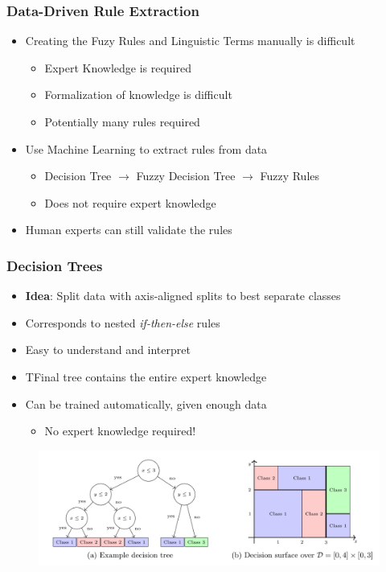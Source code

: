 \documentclass[
	10pt,
	t		%
]{beamer}
\begin{document}
\begin{frame}
	\frametitle{Data-Driven Rule Extraction}
	\begin{itemize}
		\item Creating the Fuzy Rules and Linguistic Terms manually is difficult
		      \begin{itemize}
			      \item Expert Knowledge is required
			      \item Formalization of knowledge is difficult
			      \item Potentially many rules required
		      \end{itemize}
		\item Use Machine Learning to extract rules from data
		      \begin{itemize}
			      \item Decision Tree $\rightarrow$ Fuzzy Decision Tree $\rightarrow$ Fuzzy Rules {\footnotesize \cite{CROCKETT20062809}}
			      \item Does not require expert knowledge
		      \end{itemize}
		\item Human experts can still validate the rules
	\end{itemize}
\end{frame}

\begin{frame}
	\frametitle{Decision Trees}

	\begin{itemize}
		\item \textbf{Idea}: Split data with axis-aligned splits to best separate classes
		\item Corresponds to nested \textit{if-then-else} rules
		\item Easy to understand and interpret
		\item TFinal tree contains the entire expert knowledge
		\item Can be trained automatically, given enough data
		      \begin{itemize}
			      \item No expert knowledge required!
		      \end{itemize}
	\end{itemize}

	\begin{figure}
		\centering
		\includegraphics[width=1\textwidth]{figures/decision-tree.png}
	\end{figure}

\end{frame}
\end{document}
